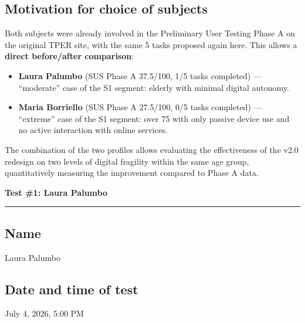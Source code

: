 ﻿\documentclass[11pt,a4paper]{article}
\begin{document}
\subsection*{Motivation for choice of subjects}
\begin{tcolorbox}[base]
Both subjects were already involved in the Preliminary
User Testing Phase A on the original TPER site, with the same
5 tasks proposed again here. This allows a \textbf{direct
before/after comparison}:

\begin{itemize}[leftmargin=*]
  \item \textbf{Laura Palumbo} (SUS Phase A 37.5/100, 1/5 tasks
  completed) --- ``moderate'' case of the S1 segment: elderly
  with minimal digital autonomy.
  \item \textbf{Maria Borriello} (SUS Phase A 27.5/100, 0/5 tasks
  completed) --- ``extreme'' case of the S1 segment: over 75
  with only passive device use and no active interaction
  with online services.
\end{itemize}

The combination of the two profiles allows evaluating the effectiveness
of the v2.0 redesign on two levels of digital fragility within
the same age group, quantitatively measuring the
improvement compared to Phase A data.
\end{tcolorbox}


\newpage
\begin{center}
  {\color{primaryColor}\large\bfseries Test \#1: Laura Palumbo}\\
  \vspace{0.1cm}
  \color{borderColor}\hrule
\end{center}

\vspace{0.5cm}

\subsection*{Name}
\begin{tcolorbox}[base]
Laura Palumbo
\end{tcolorbox}

\subsection*{Date and time of test}
\begin{tcolorbox}[base]
July 4, 2026, 5:00 PM
\end{tcolorbox}
\end{document}
